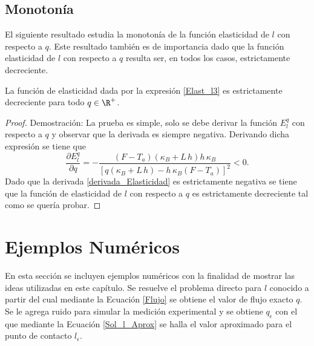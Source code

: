 \subsection{Monoton\'ia} \label{subsec:Monotonia}
%
El siguiente resultado estudia la monoton\'ia de la funci\'on elasticidad de $l$ con respecto a $q$. Este resultado tambi\'en es de importancia dado que la funci\'on elasticidad de $l$ con respecto a $q$ resulta ser, en todos los casos, estrictamente decreciente. 
%
\begin{lem} \label{monotonia}
%
La funci\'on de elasticidad dada por la expresi\'on \eqref{Elast_l3} es estrictamente decreciente para todo $q \in \R^+ $.
%
\end{lem}
%
\begin{proof}{Demostraci\'on:}
%
La prueba es simple, solo se debe derivar la funci\'on $E_{l}^{q}$ con respecto a $q$ y observar que la derivada es siempre negativa. 
Derivando dicha expresi\'on se tiene que 
%
\begin{equation}
\label{derivada_Elasticidad}
\dfrac{\partial E_{l}^{q}}{\partial q}= -\dfrac{(F-T_a)(\kappa_B+L \, h) h \,\kappa_B }{\left[q(\kappa_B+L \, h)-h \,\kappa_B (F-T_a) \right]^2}<0.
\end{equation}
%
Dado que la derivada \eqref{derivada_Elasticidad} es estrictamente negativa se tiene que la funci\'on de elasticidad de $l$ con respecto a $q$
es estrictamente decreciente tal como se quer\'ia probar.
%
\end{proof}
%
%
\section{Ejemplos Num\'ericos} \label{sec:ej_Num7}
%
En esta secci\'on se incluyen ejemplos num\'ericos con la finalidad 
de mostrar las ideas utilizadas en este cap\'itulo.
Se resuelve el problema directo para $l$ conocido a partir del cual mediante la Ecuaci\'on \eqref{Flujo} se obtiene el valor de flujo exacto $q$. Se le agrega ruido para simular la medici\'on experimental y se obtiene $q_\epsilon$ con el que mediante la Ecuaci\'on \eqref{Sol_l_Aprox} se halla el valor aproximado para el punto de contacto $l_\epsilon$.

